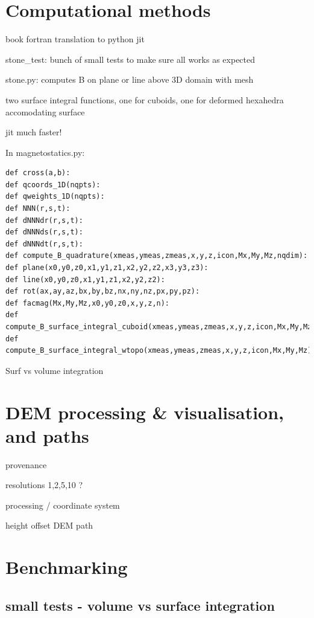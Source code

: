 \section*{Computational methods}

book fortran
translation to python
jit
 
stone\_test: bunch of small tests to make sure all works as expected 

stone.py: computes B on plane or line above 3D domain with mesh

two surface integral functions, one for cuboids, one for deformed hexahedra accomodating surface

jit much faster!

In magnetostatics.py:
\begin{verbatim}
def cross(a,b):
def qcoords_1D(nqpts):
def qweights_1D(nqpts):
def NNN(r,s,t):
def dNNNdr(r,s,t):
def dNNNds(r,s,t):
def dNNNdt(r,s,t):
def compute_B_quadrature(xmeas,ymeas,zmeas,x,y,z,icon,Mx,My,Mz,nqdim):
def plane(x0,y0,z0,x1,y1,z1,x2,y2,z2,x3,y3,z3):
def line(x0,y0,z0,x1,y1,z1,x2,y2,z2):
def rot(ax,ay,az,bx,by,bz,nx,ny,nz,px,py,pz):
def facmag(Mx,My,Mz,x0,y0,z0,x,y,z,n):
def compute_B_surface_integral_cuboid(xmeas,ymeas,zmeas,x,y,z,icon,Mx,My,Mz):
def compute_B_surface_integral_wtopo(xmeas,ymeas,zmeas,x,y,z,icon,Mx,My,Mz):
\end{verbatim}

Surf vs volume integration 


\section*{DEM processing \& visualisation, and paths}

provenance

resolutions 1,2,5,10 ?

processing / coordinate system

height offset DEM path

\section*{Benchmarking}

\subsection*{small tests - volume vs surface integration}




